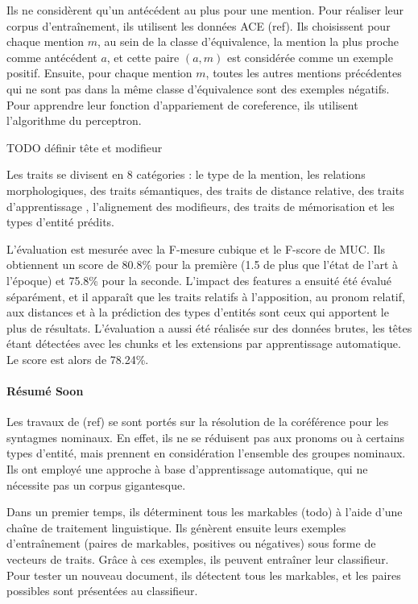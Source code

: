 \documentclass[a4paper,12pt]{article}
\begin{document}
Ils ne considèrent qu'un antécédent au plus pour une mention. Pour réaliser leur corpus d'entraînement, ils utilisent les données ACE (ref). Ils choisissent pour chaque mention $m$, au sein de la classe d'équivalence, la mention la plus proche comme antécédent $a$, et cette paire $(a,m)$ est considérée comme un exemple positif. Ensuite, pour chaque mention $m$, toutes les autres mentions précédentes qui ne sont pas dans la même classe d'équivalence sont des exemples négatifs. Pour apprendre leur fonction d'appariement de coreference, ils utilisent l'algorithme du perceptron.

TODO définir tête et modifieur

Les traits se divisent en 8 catégories : le type de la mention, les relations morphologiques, des traits sémantiques, des traits de distance relative, des traits d'apprentissage , l'alignement des modifieurs, des traits de mémorisation et les types d'entité prédits.

L'évaluation est mesurée avec la F-mesure cubique et le F-score de MUC. Ils obtiennent un score de 80.8\% pour la première (1.5 de plus que l'état de l'art à l'époque) et 75.8\% pour la seconde.
L'impact des features a ensuité été évalué séparément, et il apparaît que les traits relatifs à l'apposition, au pronom relatif, aux distances et à la prédiction des types d'entités sont ceux qui apportent le plus de résultats.
L'évaluation a aussi été réalisée sur des données brutes, les têtes étant détectées avec les chunks et les extensions par apprentissage automatique. Le score est alors de 78.24\%.

\paragraph{Résumé Soon}
Les travaux de (ref) se sont portés sur la résolution de la coréférence pour les syntagmes nominaux. En effet, ils ne se réduisent pas aux pronoms ou à certains types d'entité, mais prennent en considération l'ensemble des groupes nominaux. Ils ont employé une approche à base d'apprentissage automatique, qui ne nécessite pas un corpus gigantesque.

Dans un premier temps, ils déterminent tous les markables (todo) à l'aide d'une cha\^ine de traitement linguistique. Ils génèrent ensuite leurs exemples d'entra\^inement (paires de markables, positives ou négatives) sous forme de vecteurs de traits. Gr\^ace à ces exemples, ils peuvent entra\^iner leur classifieur. Pour tester un nouveau document, ils détectent tous les markables, et les paires possibles sont présentées au classifieur.
\end{document}
